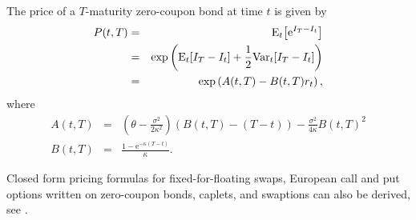 The price of a $T$-maturity zero-coupon bond at time $t$ is given by
\begin{eqnarray}
P(t,T) &=& \mathrm{E}_t\! \left[ \text{e}^{I_T - I_t} \right] \\
&=& \exp \left( \mathrm{E}_t\! \left[ I_T - I_t \right] + \frac{1}{2} \mathrm{Var}_t\! \left[ I_T - I_t \right] \right) \\
&=& \exp \left( A(t,T) - B(t,T) r_t \right) ,
\end{eqnarray}
where
\begin{eqnarray}
A(t,T) &=& \left( \theta - \frac{\sigma^2}{2 \kappa^2} \right) \left( B(t,T) - (T- t)\right) - \frac{\sigma^2}{4 \kappa} B(t,T)^2 \\
B(t,T) &=& \frac{1 - \text{e}^{-\kappa (T-t)}}{\kappa}.
\end{eqnarray}

Closed form pricing formulas for fixed-for-floating swaps, European call and put options written on zero-coupon bonds, caplets, and swaptions can also be derived, see \cite{Brigo2007, Andersen2010}.